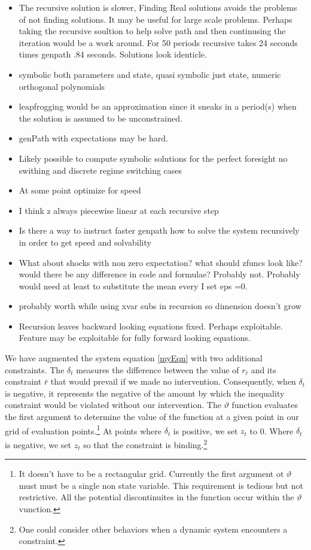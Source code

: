 \documentclass[12pt]{article}
\begin{document}
\begin{itemize}
\item 
The recursive solution is slower, Finding Real solutions avoids the problems of not finding solutions. It may be useful for large scale problems. 
 Perhaps taking the recursive soultion to help solve path and then continusing the iteration would be a work around.  For 50 periods recursive takes 24 seconds times genpath .84 seconds.  Solutions look identicle.


\item 
symbolic both parameters and state, quasi symbolic just state, numeric orthogonal polynomials
\item leapfrogging would be an approximation since it sneaks in a period(s) when the solution is assumed to be unconstrained.


\item genPath with expectations may be hard.


\item Likely possible to compute symbolic solutions for the perfect foresight no swithing and discrete regime switching cases
\item At some point optimize for speed

\item I think z always piecewise linear at each recursive step
\item Is there a way to instruct faster genpath how to solve the system recursively in order to get speed and solvability
\item What about shocks with non zero expectation?  what should zfuncs look like? would there be any difference in code and formulae?  Probably not.  Probably would need at least to substitute the mean every I set eps =0.
\item probably worth while using xvar subs in recursion so dimension doesn't grow


\item Recursion leaves backward looking equations fixed. Perhaps exploitable.  Feature may be exploitable for fully forward looking equations.
\end{itemize}


We have augmented the system equation \ref{myEqn} with 
two additional constraints.
The $\delta_t$ measures the difference between the value of $r_t$ and its constraint $\bar{r}$ that would prevail if we made no intervention.  Consequently, when $\delta_t$ is negative, it represents the negative of the amount by which the inequality constraint would be violated without our intervention.  The $\vartheta$ function evaluates the first argument to determine the value of the function at a given point in our grid of evaluation points.\footnote{It doesn't have to be a rectangular grid.  Currently the first argument ot $\vartheta$ must must be a single non state variable.  This requirement is tedious but not restrictive.  All the potential discontinuites in the function occur within the $\vartheta$ vunction.} At points where $\delta_t$ is positive, we set $z_t$ to 0.  Where $\delta_t$ is negative, we set $z_t$ so that the constraint is binding.\footnote{ One could consider other behaviors when a dynamic system encounters a constraint.}
\end{document}
